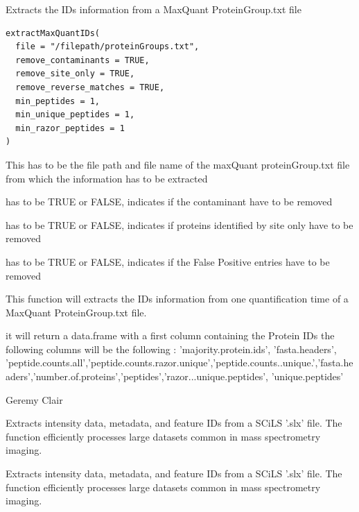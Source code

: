 \documentclass[a4paper]{book}
\begin{document}
%
\begin{Description}
Extracts the IDs information from a MaxQuant ProteinGroup.txt file
\end{Description}
%
\begin{Usage}
\begin{verbatim}
extractMaxQuantIDs(
  file = "/filepath/proteinGroups.txt",
  remove_contaminants = TRUE,
  remove_site_only = TRUE,
  remove_reverse_matches = TRUE,
  min_peptides = 1,
  min_unique_peptides = 1,
  min_razor_peptides = 1
)
\end{verbatim}
\end{Usage}
%
\begin{Arguments}
\begin{ldescription}
\item[\code{file}] This has to be the file path and file name of the maxQuant proteinGroup.txt file from which the information has to be extracted

\item[\code{remove\_contaminants}] has to be TRUE or FALSE, indicates if the contaminant have to be removed

\item[\code{remove\_site\_only}] has to be TRUE or FALSE, indicates if proteins identified by site only have to be removed

\item[\code{remove\_reverse\_matches}] has to be TRUE or FALSE, indicates if the False Positive entries have to be removed
\end{ldescription}
\end{Arguments}
%
\begin{Details}
This function will extracts the IDs information from one quantification time of a MaxQuant ProteinGroup.txt file.
\end{Details}
%
\begin{Value}
it will return a data.frame with a first column containing the Protein IDs the following columns will be the following : 'majority.protein.ids', 'fasta.headers', 'peptide.counts.all','peptide.counts.razor.unique','peptide.counts..unique.','fasta.headers','number.of.proteins','peptides','razor...unique.peptides', 'unique.peptides'
\end{Value}
%
\begin{Author}
Geremy Clair
\end{Author}
%
\begin{Description}
Extracts intensity data, metadata, and feature IDs from a SCiLS '.slx' file.
The function efficiently processes large datasets common in mass spectrometry imaging.

Extracts intensity data, metadata, and feature IDs from a SCiLS '.slx' file.
The function efficiently processes large datasets common in mass spectrometry imaging.
\end{Description}
\end{document}
